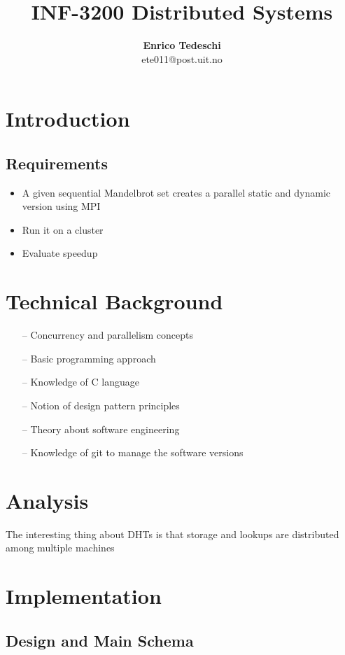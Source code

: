 \documentclass[11pt,conference]{IEEEtran}
\title{INF-3200 Distributed Systems}
\author{\textbf{Enrico Tedeschi}\\ ete011@post.uit.no }
\begin{document}
\maketitle


\section{Introduction}

\subsection{Requirements}
\begin{itemize} 
\item A given sequential Mandelbrot set creates a parallel static and dynamic version using MPI
\item Run it on a cluster
\item Evaluate speedup
\end{itemize}


\section{Technical Background}

\begin{itemize} 
\item[--] Concurrency and parallelism concepts
\item[--] Basic programming approach
\item[--] Knowledge of C language
\item[--] Notion of design pattern principles
\item[--] Theory about software engineering
\item[--] Knowledge of git to manage the software versions
\end{itemize}


\section{Analysis}
The interesting thing about DHTs is that storage and lookups are distributed among multiple machines \cite{citation1}


\section{Implementation}

\subsection{Design and Main Schema}
\end{document}
